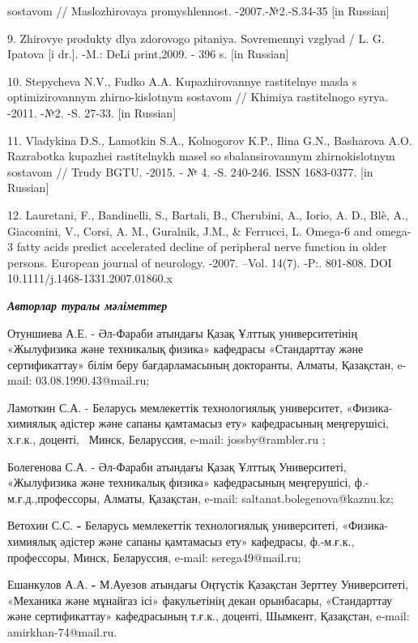 \begin{noparindent}
sostavom // Maslozhirovaya promyshlennost\textquotesingle.
-2007.-№2.-S.34-35 {[}in Russian{]}

9. Zhirovye produkty dlya zdorovogo pitaniya. Sovremennyi vzglyad / L.
G. Ipatova {[}i dr.{]}. -M.: DeLi print,2009. - 396 s. {[}in Russian{]}

10. Stepycheva N.V., Fud\textquotesingle ko A.A. Kupazhirovannye
rastitel\textquotesingle nye masla s optimizirovannym zhirno-kislotnym
sostavom // Khimiya rastitel\textquotesingle nogo
syr\textquotesingle ya. -2011. -№2. -S. 27-33. {[}in Russian{]}

11. Vladykina D.S., Lamotkin S.A., Kolnogorov K.P.,
Il\textquotesingle ina G.N., Basharova A.O. Razrabotka kupazhei
rastitel\textquotesingle nykh masel so sbalansirovannym zhirnokislotnym
sostavom // Trudy BGTU. -2015. - № 4. -S. 240-246. ISSN 1683-0377. {[}in
Russian{]}

12. Lauretani, F., Bandinelli, S., Bartali, B., Cherubini, A., Iorio, A.
D., Blè, A., Giacomini, V., Corsi, A. M., Guralnik, J.M., \& Ferrucci,
L. Omega-6 and omega-3 fatty acids predict accelerated decline of
peripheral nerve function in older persons. European journal of
neurology. -2007. --Vol. 14(7). -P:. 801-808. DOI
10.1111/j.1468-1331.2007.01860.x
\end{noparindent}

\emph{{\bfseries Авторлар туралы мәліметтер}}

\begin{noparindent}
Отуншиева А.Е. - Әл-Фараби атындағы Қазақ Ұлттық университетінің
«Жылуфизика және техникалық физика» кафедрасы «Стандарттау және
сертификаттау» білім беру бағдарламасының докторанты, Алматы, Қазақстан,
e-mail: 03.08.1990.43@mail.ru;

Ламоткин С.А. - Беларусь мемлекеттік технологиялық университет,
«Физика-химиялық әдістер және сапаны қамтамасыз ету» кафедрасының
меңгерушісі, х.ғ.к., доценті,~ Минск, Беларуссия, e‑mail:
jossby@rambler.ru ;

Болегенова С.А. - Әл-Фараби атындағы Қазақ Ұлттық Университеті,
«Жылуфизика және техникалық физика» кафедрасының меңгерушісі,
ф.-м.ғ.д.,профессоры, Алматы, Қазақстан, e‑mail:
saltanat.bolegenova@kaznu.kz;

Ветохин С.С. {\bfseries -} Беларусь мемлекеттік технологиялық университеті,
«Физика-химиялық әдістер және сапаны қамтамасыз ету» кафедрасы,
ф.-м.ғ.к., профессоры, Минск, Беларуссия, e‑mail: serega49@mail.ru;

Ешанкулов А.А. {\bfseries -} М.Ауезов атындағы Оңтүстік Қазақстан Зерттеу
Университеті, «Механика және мұнайгаз ісі» факульетінің декан
орынбасары, «Стандарттау және сертификаттау» кафедрасының т.ғ.к.,
доценті, Шымкент, Қазақстан, e‑mail: amirkhan-74@mail.ru.
\end{noparindent}


